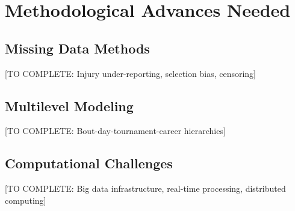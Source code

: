 \section{Methodological Advances Needed}

\subsection{Missing Data Methods}

[TO COMPLETE: Injury under-reporting, selection bias, censoring]

\subsection{Multilevel Modeling}

[TO COMPLETE: Bout-day-tournament-career hierarchies]

\subsection{Computational Challenges}

[TO COMPLETE: Big data infrastructure, real-time processing, distributed computing]